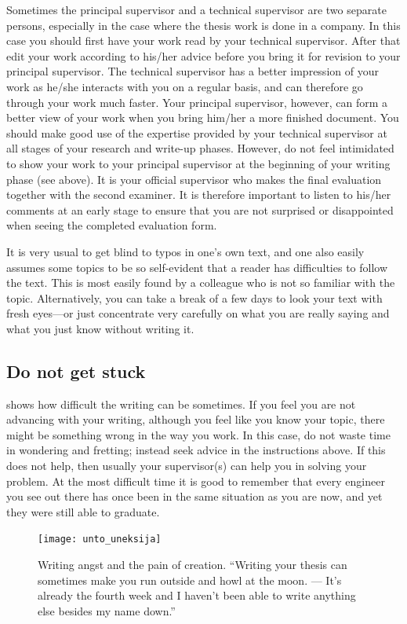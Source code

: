 Sometimes the principal supervisor and a technical supervisor are two
separate persons, especially in the case where the thesis work is
done in a company. In this case you should first have your work read
by your technical supervisor. After that edit your work according to
his/her advice before you bring it for revision to your principal
supervisor. The technical supervisor has a better impression of your
work as he/she interacts with you on a regular basis, and can
therefore go through your work much faster. Your principal
supervisor, however, can form a better view of your work when you
bring him/her a more finished document. You should make good use of
the expertise provided by your technical supervisor at all stages of
your research and write-up phases. However, do not feel intimidated
to show your work to your principal supervisor at the beginning of
your writing phase (see  above). It is your
official supervisor who makes the final evaluation together with the
second examiner. It is therefore important to listen to his/her
comments at an early stage to ensure that you are not surprised or
disappointed when seeing the completed evaluation form.

It is very usual to get blind to typos in one’s own text, and one
also easily assumes some topics to be so self-evident that a reader
has difficulties to follow the text. This is most easily found by a
colleague who is not so familiar with the topic. Alternatively, you
can take a break of a few days to look your text with fresh eyes---or
just concentrate very carefully on what you are really saying and
what you just know without writing it.

\subsection{Do not get stuck}

 shows how difficult the writing can be
sometimes. If you feel you are not advancing with your writing,
although you feel like you know your topic, there might be something
wrong in the way you work. In this case, do not waste time in
wondering and fretting; instead seek advice in the instructions
above. If this does not help, then usually your supervisor(s) can
help you in solving your problem. At the most difficult time it is
good to remember that every engineer you see out there has once been
in the same situation as you are now, and yet they were still able to graduate.

\begin{figure}[ht]
  \begin{center}
    \texttt{[image: unto\_uneksija]}
  \end{center}
  \caption{Writing angst and the pain of creation. “Writing your thesis
    can sometimes
    make you run outside and howl at the moon. --- It’s already the
    fourth week and I
  haven’t been able to write anything else besides my name down.”}
  \label{fig:unto_uneksija}
\end{figure}

